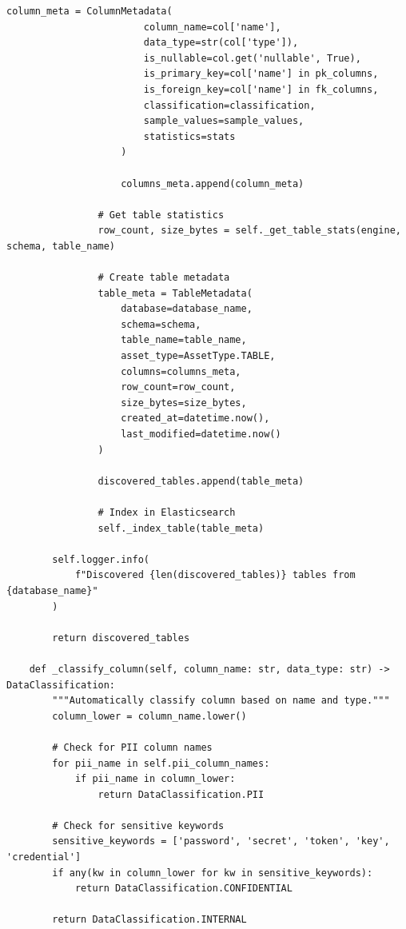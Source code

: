 \begin{lstlisting}[style=python, caption=MetadataCatalog with Automated Metadata Discovery]
                    column_meta = ColumnMetadata(
                        column_name=col['name'],
                        data_type=str(col['type']),
                        is_nullable=col.get('nullable', True),
                        is_primary_key=col['name'] in pk_columns,
                        is_foreign_key=col['name'] in fk_columns,
                        classification=classification,
                        sample_values=sample_values,
                        statistics=stats
                    )

                    columns_meta.append(column_meta)

                # Get table statistics
                row_count, size_bytes = self._get_table_stats(engine, schema, table_name)

                # Create table metadata
                table_meta = TableMetadata(
                    database=database_name,
                    schema=schema,
                    table_name=table_name,
                    asset_type=AssetType.TABLE,
                    columns=columns_meta,
                    row_count=row_count,
                    size_bytes=size_bytes,
                    created_at=datetime.now(),
                    last_modified=datetime.now()
                )

                discovered_tables.append(table_meta)

                # Index in Elasticsearch
                self._index_table(table_meta)

        self.logger.info(
            f"Discovered {len(discovered_tables)} tables from {database_name}"
        )

        return discovered_tables

    def _classify_column(self, column_name: str, data_type: str) -> DataClassification:
        """Automatically classify column based on name and type."""
        column_lower = column_name.lower()

        # Check for PII column names
        for pii_name in self.pii_column_names:
            if pii_name in column_lower:
                return DataClassification.PII

        # Check for sensitive keywords
        sensitive_keywords = ['password', 'secret', 'token', 'key', 'credential']
        if any(kw in column_lower for kw in sensitive_keywords):
            return DataClassification.CONFIDENTIAL

        return DataClassification.INTERNAL


\end{lstlisting}
